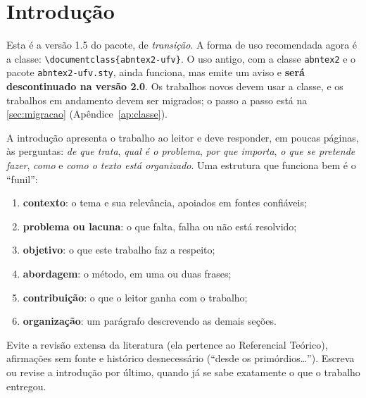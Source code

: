 \chapter{Introdução}\label{sec:introducao}

\begin{dica}
Esta é a versão 1.5 do pacote, de \emph{transição}. A forma de uso recomendada agora é a
classe: \texttt{\textbackslash documentclass\{abntex2-ufv\}}. O uso antigo, com a classe
\texttt{abntex2} e o pacote \texttt{abntex2-ufv.sty}, ainda funciona, mas emite um aviso e
\textbf{será descontinuado na versão 2.0}. Os trabalhos novos devem usar a classe, e os
trabalhos em andamento devem ser migrados; o passo a passo está na
\autoref{sec:migracao} (Apêndice~\ref{ap:classe}).
\end{dica}

\begin{dica}
A introdução apresenta o trabalho ao leitor e deve responder, em poucas páginas,
às perguntas: \emph{de que trata}, \emph{qual é o problema}, \emph{por que
importa}, \emph{o que se pretende fazer}, \emph{como} e \emph{como o texto está
organizado}. Uma estrutura que funciona bem é o ``funil'':
\begin{enumerate}
  \item \textbf{contexto}: o tema e sua relevância, apoiados em fontes confiáveis;
  \item \textbf{problema ou lacuna}: o que falta, falha ou não está resolvido;
  \item \textbf{objetivo}: o que este trabalho faz a respeito;
  \item \textbf{abordagem}: o método, em uma ou duas frases;
  \item \textbf{contribuição}: o que o leitor ganha com o trabalho;
  \item \textbf{organização}: um parágrafo descrevendo as demais seções.
\end{enumerate}
Evite a revisão extensa da literatura (ela pertence ao Referencial Teórico),
afirmações sem fonte e histórico desnecessário (``desde os primórdios\ldots'').
Escreva ou revise a introdução por último, quando já se sabe exatamente o que o
trabalho entregou.
\end{dica}

